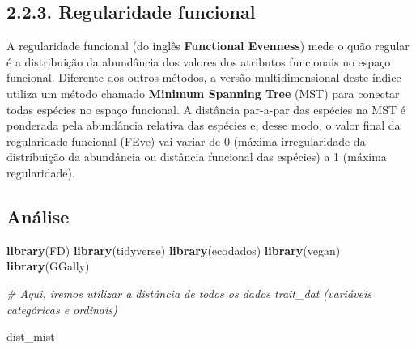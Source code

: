 \documentclass[
]{book}
\newenvironment{Shaded}{\begin{snugshade}}{\end{snugshade}}
\newcommand{\CommentTok}[1]{\textcolor[rgb]{0.56,0.35,0.01}{\textit{#1}}}
\newcommand{\KeywordTok}[1]{\textcolor[rgb]{0.13,0.29,0.53}{\textbf{#1}}}
\newcommand{\NormalTok}[1]{#1}
\begin{document}
\hypertarget{regularidade-funcional}{%
\subsection{2.2.3. Regularidade funcional}\label{regularidade-funcional}}

A regularidade funcional (do inglês \textbf{Functional Evenness}) mede o quão regular é a distribuição da abundância dos valores dos atributos funcionais no espaço funcional. Diferente dos outros métodos, a versão multidimensional deste índice utiliza um método chamado \textbf{Minimum Spanning Tree} (MST) para conectar todas espécies no espaço funcional. A distância par-a-par das espécies na MST é ponderada pela abundância relativa das espécies e, desse modo, o valor final da regularidade funcional (FEve) vai variar de 0 (máxima irregularidade da distribuição da abundância ou distância funcional das espécies) a 1 (máxima regularidade).

\hypertarget{anuxe1lise-1}{%
\subsection{Análise}\label{anuxe1lise-1}}

\begin{Shaded}
\begin{Highlighting}[]
\KeywordTok{library}\NormalTok{(FD)}
\KeywordTok{library}\NormalTok{(tidyverse)}
\KeywordTok{library}\NormalTok{(ecodados)}
\KeywordTok{library}\NormalTok{(vegan)}
\KeywordTok{library}\NormalTok{(GGally)}

\CommentTok{# Aqui, iremos utilizar a distância de todos os dados trait_dat (variáveis categóricas e ordinais)}

\NormalTok{dist_mist}
\end{Highlighting}
\end{Shaded}
\end{document}
